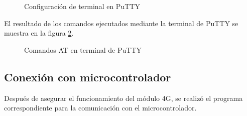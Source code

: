 	\begin{figure}[htbp!]
		\centering
		\caption{Configuración de terminal en PuTTY}
		\label{fig:ConfiguracionPutty}
	\end{figure}
 
El resultado de los comandos ejecutados mediante la terminal de PuTTY se muestra en la figura \ref{fig:TerminalPutty}.

	\begin{figure}[htbp!]
		\centering
		\caption{Comandos AT en terminal de PuTTY}
		\label{fig:TerminalPutty}
	\end{figure}


\subsection{Conexión con microcontrolador}
Después de asegurar el funcionamiento del módulo 4G, se realizó el programa correspondiente para la comunicación con el microcontrolador.\\

